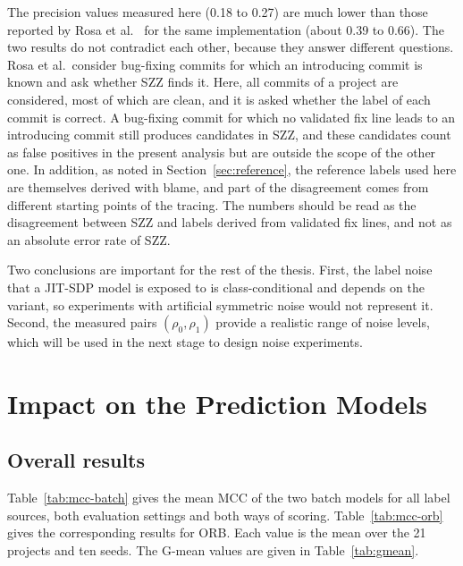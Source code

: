 \documentclass[12pt,a4paper,oneside]{report}
\newcommand{\rhoz}{\rho_0}
\newcommand{\rhoo}{\rho_1}
\begin{document}
The precision values measured here (0.18 to 0.27) are much lower than those
reported by Rosa et al.~\cite{rosa2023szzvariants} for the same
implementation (about 0.39 to 0.66). The two results do not contradict each
other, because they answer different questions. Rosa et al.\ consider
bug-fixing commits for which an introducing commit is known and ask whether
SZZ finds it. Here, all commits of a project are considered, most of which
are clean, and it is asked whether the label of each commit is correct. A
bug-fixing commit for which no validated fix line leads to an introducing
commit still produces candidates in SZZ, and these candidates count as false
positives in the present analysis but are outside the scope of the other one.
In addition, as noted in Section~\ref{sec:reference}, the reference labels
used here are themselves derived with blame, and part of the disagreement
comes from different starting points of the tracing. The numbers should be
read as the disagreement between SZZ and labels derived from validated fix
lines, and not as an absolute error rate of SZZ.

Two conclusions are important for the rest of the thesis. First, the label
noise that a JIT-SDP model is exposed to is class-conditional and depends on
the variant, so experiments with artificial symmetric noise would not
represent it. Second, the measured pairs $(\rhoz,\rhoo)$ provide a realistic
range of noise levels, which will be used in the next stage to design noise
experiments.

\section{Impact on the Prediction Models}\label{sec:res-impact}

\subsection{Overall results}

Table~\ref{tab:mcc-batch} gives the mean MCC of the two batch models for all
label sources, both evaluation settings and both ways of scoring.
Table~\ref{tab:mcc-orb} gives the corresponding results for ORB. Each value
is the mean over the 21 projects and ten seeds. The G-mean values are given
in Table~\ref{tab:gmean}.
\end{document}
